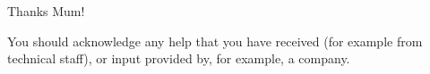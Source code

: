 Thanks Mum!

You should acknowledge any help that you have received (for example from technical staff), or input provided by, for example, a company.

